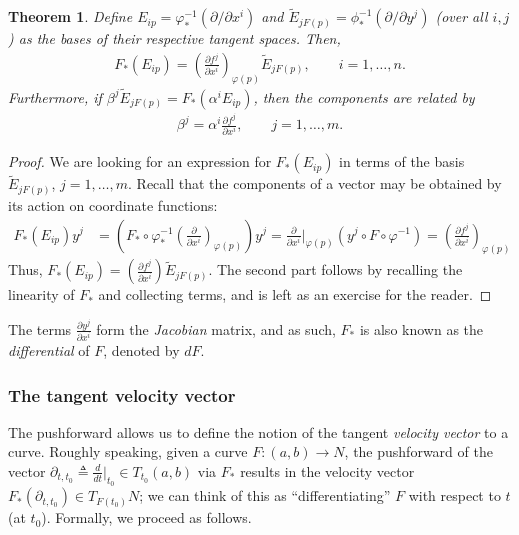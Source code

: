 \documentclass[psamsfonts]{amsart}
\newtheorem{thm}{Theorem}[section]
\theoremstyle{definition}
\theoremstyle{remark}
\numberwithin{equation}{section}
\begin{document}
\begin{thm}\label{thm:pushforward_in_lr}
Define $E_{ip} = \varphi^{-1}_* \left(\partial / \partial {x^i}\right)$ and $\tilde E_{jF(p)} = \phi^{-1}_* \left(\partial /\partial {y^j}\right)$ (over all $i, j$) as the bases of their respective tangent spaces. Then, 
\begin{align}
F_*(E_{ip}) = \left(\frac{\partial f^j}{\partial x^i}\right)_{\varphi(p)}\tilde E_{jF(p)}, \qquad i = 1, \dots, n.
\end{align}
Furthermore, if $\beta^j \tilde E_{jF(p)} = F_*(\alpha^i E_{ip})$, then the components are related by 
\begin{align}
\beta^j = \alpha^i\frac{\partial f^j}{\partial x^i}, \qquad j = 1, \dots, m.
\end{align}
\end{thm}
\begin{proof}
We are looking for an expression for $F_*(E_{ip})$ in terms of the basis $\tilde E_{jF(p)}$, $j = 1, \dots, m$. Recall that the components of a vector may be obtained by its action on coordinate functions:
\begin{equation}
\begin{aligned}
F_*(E_{ip})y^j & = \left(F_*\circ \varphi^{-1}_* \left(\frac{\partial}{\partial x^i}\right)_{\varphi(p)}\right)y^j= \frac{\partial}{\partial x^i}\biggr|_{\varphi(p)}(y^j\circ F \circ \varphi^{-1}) = \left(\frac{\partial f^j}{\partial x^i}\right)_{\varphi(p)}
\end{aligned}
\end{equation}
Thus, $F_*(E_{ip}) = \left(\frac{\partial f^j}{\partial x^i}\right) \tilde E_{jF(p)}$. The second part follows by recalling the linearity of $F_*$ and collecting terms, and is left as an exercise for the reader. 
\end{proof}

The terms $\frac{\partial y^j}{\partial x^i}$ form the \textit{Jacobian} matrix, and as such, $F_*$ is also known as the \textit{differential} of $F$, denoted by $dF$. 

\subsubsection{The tangent velocity vector}\label{sec:tangent_velo}
The pushforward allows us to define the notion of the tangent \textit{velocity vector} to a curve. Roughly speaking, given a {curve} $F:(a,b)\rightarrow N$, the pushforward of the vector $\partial_{t, t_0} \triangleq \frac{d}{dt} \bigr|_{t_0}\in T_{t_0}(a,b)$ via $F_*$ results in the velocity vector $F_*(\partial_{t, t_0})\in T_{F(t_0)}N$; we can think of this as ``differentiating'' $F$ with respect to $t$ (at $t_0$). Formally, we proceed as follows. 
\end{document}
